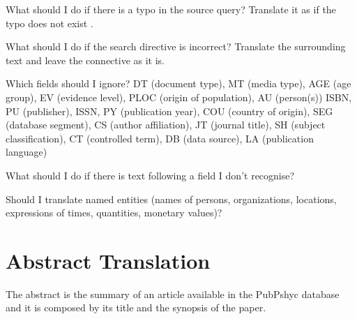 \documentclass[a4paper,10pt]{article}
\newenvironment{faq}{\begin{description}[style=nextline]}{\end{description}}
\newcommand{\cris}[1]{{\color{red}{#1}}}
\begin{document}
\begin{faq}

  \item[What should I do if there is a typo in the source query?]
    Translate it as if the typo does not exist \cris{and write a comment in the comment box}.

  \item[What should I do if the search directive is incorrect?]
    Translate the surrounding text and leave the connective as it is.
    
  \item[Which fields should I ignore?]
  DT (document type), MT (media type), AGE (age group), EV (evidence level), PLOC (origin of population), AU (person(s))
  ISBN, PU (publisher), ISSN, PY (publication year), COU (country of origin), SEG (database segment), CS (author affiliation), JT (journal title), SH (subject classification), CT (controlled term), DB (data source), LA (publication language)
  
  \item[What should I do if there is text following a field I don't recognise?]
    \cris{Ignore that text?}
    
  \item[Should I translate named entities (names of persons, organizations, locations, expressions of times, quantities, monetary values)?]
    \cris{No idea...}
    
\end{faq}



\section{Abstract Translation}
\label{s:abstracts}


The abstract is the summary of an article available in the PubPshyc database and it is composed by its title and the synopsis of the paper. 
\end{document}
